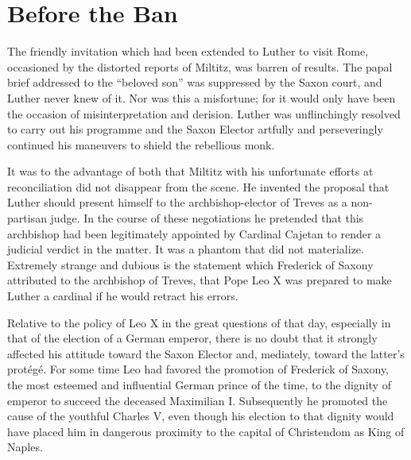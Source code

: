 \section{Before the Ban}

The friendly invitation which had been extended to Luther to
visit Rome, occasioned by the distorted reports of Miltitz, was barren
of results. The papal brief addressed to the “beloved son” was suppressed
by the Saxon court, and Luther never knew of it. Nor was
this a misfortune; for it would only have been the occasion of misinterpretation
and derision. Luther was unflinchingly resolved to
carry out his programme and the Saxon Elector artfully and perseveringly
continued his maneuvers to shield the rebellious monk.

It was to the advantage of both that Miltitz with his unfortunate
efforts at reconciliation did not disappear from the scene. He invented
the proposal that Luther should present himself to the
archbishop-elector of Treves as a non-partisan judge. In the course
of these negotiations he pretended that this archbishop had been
legitimately appointed by Cardinal Cajetan to render a judicial verdict
in the matter. It was a phantom that did not materialize. Extremely strange
and dubious is the statement which Frederick of
Saxony attributed to the archbishop of Treves, that Pope Leo X was
prepared to make Luther a cardinal if he would retract his errors.

Relative to the policy of Leo X in the great questions of that day,
especially in that of the election of a German emperor, there is no
doubt that it strongly affected his attitude toward the Saxon Elector
and, mediately, toward the latter’s protégé. For some time Leo had
favored the promotion of Frederick of Saxony, the most esteemed
and influential German prince of the time, to the dignity of emperor
to succeed the deceased Maximilian I. Subsequently he promoted the
cause of the youthful Charles V, even though his election to that
dignity would have placed him in dangerous proximity to the
capital of Christendom as King of Naples.

